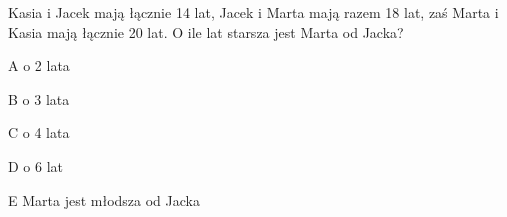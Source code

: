 \begin{tresc}
Kasia i Jacek mają łącznie 14 lat, Jacek i Marta mają razem 18 lat, zaś Marta i Kasia mają łącznie 20 lat. O ile lat starsza jest Marta od Jacka?
\end{tresc}
\begin{wariant}{A} o 2 lata \end{wariant}
\begin{wariant}{B} o 3 lata \end{wariant}
\begin{wariant}{C} o 4 lata \end{wariant}
\begin{wariant}{D} o 6 lat \end{wariant}
\begin{wariant}{E} Marta jest młodsza od Jacka \end{wariant}
